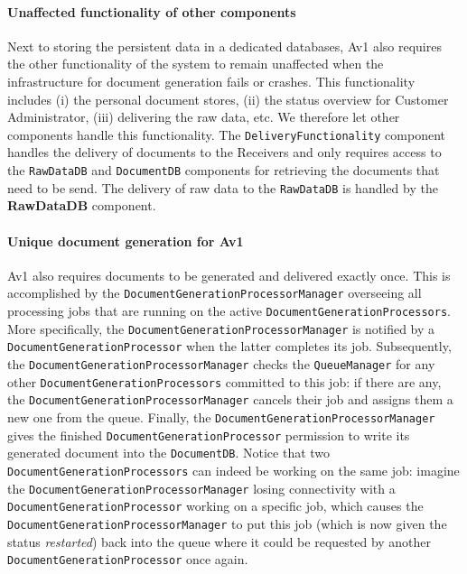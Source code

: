 \documentclass[a4paper,10pt]{article}
\begin{document}
\paragraph{Unaffected functionality of other components}
Next to storing the  persistent data in a dedicated databases, Av1 also requires the other functionality of the system to remain unaffected when the infrastructure for document generation fails or crashes. This functionality includes (i) the personal document stores, (ii) the status overview for Customer Administrator, (iii) delivering the raw data, etc.
We therefore let other components handle this functionality. The \texttt{DeliveryFunctionality} component handles the delivery of documents to the Receivers and only requires access to the \texttt{RawDataDB} and \texttt{DocumentDB} components for retrieving the documents that need to be send. The delivery of raw data to the \texttt{RawDataDB} is handled by the \textbf{RawDataDB} component.

\paragraph{Unique document generation for Av1}
Av1 also requires documents to be generated and delivered exactly once. This is accomplished by the \texttt{DocumentGenerationProcessorManager} overseeing all processing jobs that are running on the active \texttt{DocumentGenerationProcessors}. More specifically, the \texttt{DocumentGenerationProcessorManager} is notified by a \texttt{DocumentGenerationProcessor} when the latter completes its job. Subsequently, the \texttt{DocumentGenerationProcessorManager} checks the \texttt{QueueManager} for any other \texttt{DocumentGenerationProcessors} committed to this job: if there are any, the \texttt{DocumentGenerationProcessorManager} cancels their job and assigns them a new one from the queue. Finally, the \texttt{DocumentGenerationProcessorManager} gives the finished \texttt{DocumentGenerationProcessor} permission to write its generated document into the \texttt{DocumentDB}. Notice that two \texttt{DocumentGenerationProcessors} can indeed be working on the same job: imagine the \texttt{DocumentGenerationProcessorManager} losing connectivity with a \texttt{DocumentGenerationProcessor} working on a specific job, which causes the \texttt{DocumentGenerationProcessorManager} to put this job (which is now given the status \textit{restarted}) back into the queue where it could be requested by another \texttt{DocumentGenerationProcessor} once again.
\end{document}
